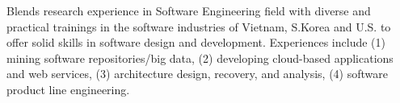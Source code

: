 


\begin{cvparagraph}
	
	Blends research experience in Software Engineering field with diverse and practical trainings in the software industries of Vietnam, S.Korea and U.S. to offer solid skills in software design and development. Experiences include (1) mining software repositories/big data, (2) developing cloud-based applications and web services, (3) architecture design, recovery, and analysis, (4) software product line engineering. 
	
\end{cvparagraph}
